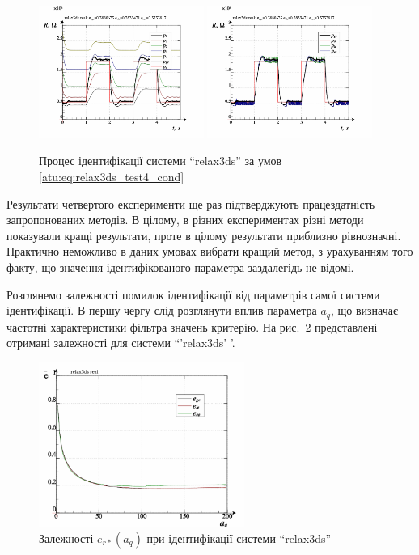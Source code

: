 \begin{figure}[htb!]
  \centerline{
    \includegraphics[width=0.48\textwidth]{p/relax3ds_read_id2_3-p_p.png}
    \hfill
    \includegraphics[width=0.48\textwidth]{p/relax3ds_read_id2_3-p_pp.png}
  }
\caption{Процес ідентифікації системи ``relax3ds'' за умов \ref{atu:eq:relax3ds_test4_cond}}
  \label{atu:f:relax3ds_id_3}
\end{figure}

Результати четвертого експерименти ще раз підтверджують
працездатність запропонованих методів. В цілому, в різних
експериментах різні методи показували кращі результати, проте
в цілому результати приблизно рівнозначні. Практично неможливо
в даних умовах вибрати кращий метод, з урахуванням того факту,
що значення ідентифікованого параметра заздалегідь не відомі.

Розглянемо залежності помилок ідентифікації від параметрів
самої системи ідентифікації. В першу чергу слід розглянути
вплив параметра
$a_q$, що визначає частотні характеристики фільтра значень
критерію. На рис.~\ref{atu:f:relax3ds_read_id2_prm_0-p_a_q} представлені отримані
залежності для системи ``'relax3ds' '.

\begin{figure}[htb!]
  \centerline{\includegraphics[width=0.6\textwidth]{p/relax3ds_read_id2_prm_0-p_a_q.png} }
\caption{Залежності $\overline{e}_{r *} (a_q) $ при ідентифікації системи ``relax3ds''}
  \label{atu:f:relax3ds_read_id2_prm_0-p_a_q}
\end{figure}

